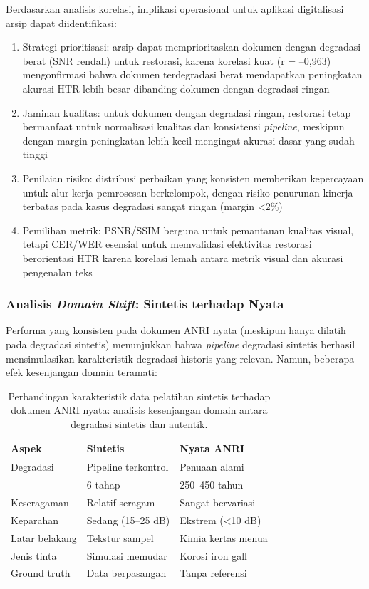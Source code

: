 \documentclass[journal]{IEEEtran}
\begin{document}
Berdasarkan analisis korelasi, implikasi operasional untuk aplikasi digitalisasi arsip dapat diidentifikasi:

\begin{enumerate}
    \item Strategi prioritisasi: arsip dapat memprioritaskan dokumen dengan degradasi berat (SNR rendah) untuk restorasi, karena korelasi kuat (r = --0,963) mengonfirmasi bahwa dokumen terdegradasi berat mendapatkan peningkatan akurasi HTR lebih besar dibanding dokumen dengan degradasi ringan
    \item Jaminan kualitas: untuk dokumen dengan degradasi ringan, restorasi tetap bermanfaat untuk normalisasi kualitas dan konsistensi \textit{pipeline}, meskipun dengan margin peningkatan lebih kecil mengingat akurasi dasar yang sudah tinggi
    \item Penilaian risiko: distribusi perbaikan yang konsisten memberikan kepercayaan untuk alur kerja pemrosesan berkelompok, dengan risiko penurunan kinerja terbatas pada kasus degradasi sangat ringan (margin <2\%)
    \item Pemilihan metrik: PSNR/SSIM berguna untuk pemantauan kualitas visual, tetapi CER/WER esensial untuk memvalidasi efektivitas restorasi berorientasi HTR karena korelasi lemah antara metrik visual dan akurasi pengenalan teks
\end{enumerate}

\subsubsection{Analisis \textit{Domain Shift}: Sintetis terhadap Nyata}

Performa yang konsisten pada dokumen ANRI nyata (meskipun hanya dilatih pada degradasi sintetis) menunjukkan bahwa \textit{pipeline} degradasi sintetis berhasil mensimulasikan karakteristik degradasi historis yang relevan. Namun, beberapa efek kesenjangan domain teramati:

\begin{table}[!t]
\renewcommand{\arraystretch}{1.15}
\caption{Perbandingan karakteristik data pelatihan sintetis terhadap dokumen ANRI nyata: analisis kesenjangan domain antara degradasi sintetis dan autentik.}
\label{table:synthetic_vs_real_comparison}
\centering
\begin{tabular}{|p{2.5cm}|p{2.8cm}|p{2.8cm}|}
\hline
\textbf{Aspek} & \textbf{Sintetis} & \textbf{Nyata ANRI} \\
\hline
Degradasi & Pipeline terkontrol & Penuaan alami \\
& 6 tahap & 250--450 tahun \\
\hline
Keseragaman & Relatif seragam & Sangat bervariasi \\
\hline
Keparahan & Sedang (15--25 dB) & Ekstrem (<10 dB) \\
\hline
Latar belakang & Tekstur sampel & Kimia kertas menua \\
\hline
Jenis tinta & Simulasi memudar & Korosi iron gall \\
\hline
Ground truth & Data berpasangan & Tanpa referensi \\
\hline
\end{tabular}
\end{table}
\end{document}
